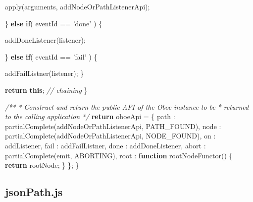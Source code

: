 \documentclass[]{article}
\newenvironment{Shaded}{}{}
\newcommand{\KeywordTok}[1]{\textcolor[rgb]{0.00,0.44,0.13}{\textbf{{#1}}}}
\newcommand{\DataTypeTok}[1]{\textcolor[rgb]{0.56,0.13,0.00}{{#1}}}
\newcommand{\StringTok}[1]{\textcolor[rgb]{0.25,0.44,0.63}{{#1}}}
\newcommand{\CommentTok}[1]{\textcolor[rgb]{0.38,0.63,0.69}{\textit{{#1}}}}
\newcommand{\FunctionTok}[1]{\textcolor[rgb]{0.02,0.16,0.49}{{#1}}}
\newcommand{\NormalTok}[1]{{#1}}
\begin{document}
\begin{Shaded}
\begin{Highlighting}[]
         \FunctionTok{apply}\NormalTok{(arguments, addNodeOrPathListenerApi);}
         
      \NormalTok{\} }\KeywordTok{else} \KeywordTok{if}\NormalTok{( eventId == }\StringTok{'done'} \NormalTok{) \{}
      
         \FunctionTok{addDoneListener}\NormalTok{(listener);}
                              
      \NormalTok{\} }\KeywordTok{else} \KeywordTok{if}\NormalTok{( eventId == }\StringTok{'fail'} \NormalTok{) \{}
      
         \FunctionTok{addFailListner}\NormalTok{(listener);}
      \NormalTok{\}}
             
      \KeywordTok{return} \KeywordTok{this}\NormalTok{; }\CommentTok{// chaining}
   \NormalTok{\}   }
   
   \CommentTok{/**}
\CommentTok{    * Construct and return the public API of the Oboe instance to be }
\CommentTok{    * returned to the calling application}
\CommentTok{    */}
   \KeywordTok{return} \NormalTok{oboeApi = \{ }
      \DataTypeTok{path  }\NormalTok{:  }\FunctionTok{partialComplete}\NormalTok{(addNodeOrPathListenerApi, PATH_FOUND), }
      \DataTypeTok{node  }\NormalTok{:  }\FunctionTok{partialComplete}\NormalTok{(addNodeOrPathListenerApi, NODE_FOUND),}
      \DataTypeTok{on    }\NormalTok{:  addListener,}
      \DataTypeTok{fail  }\NormalTok{:  addFailListner,}
      \DataTypeTok{done  }\NormalTok{:  addDoneListener,}
      \DataTypeTok{abort }\NormalTok{:  }\FunctionTok{partialComplete}\NormalTok{(emit, ABORTING),}
      \DataTypeTok{root  }\NormalTok{:  }\KeywordTok{function} \FunctionTok{rootNodeFunctor}\NormalTok{() \{}
                  \KeywordTok{return} \NormalTok{rootNode;}
               \NormalTok{\}}
   \NormalTok{\};}
\NormalTok{\}}
\end{Highlighting}
\end{Shaded}

\pagebreak

\subsection{jsonPath.js}

\label{src_jsonPath}
\end{document}
